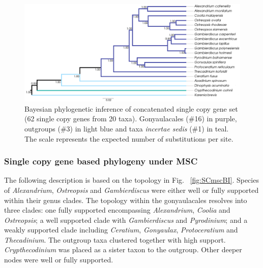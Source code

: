 \documentclass[fleqn,10pt,lineno]{wlpeerj} %
\begin{document}
\begin{figure}[ht] 
\centering
\includegraphics[width=\linewidth]{gonya-figs/SC-concat-BI.png} 
\caption{Bayesian phylogenetic inference of concatenated single copy gene set (62 single copy genes from 20 taxa). Gonyaulacales (\#16) in purple, outgroups (\#3) in light blue and taxa \textit{incertae sedis} (\#1) in teal. The scale represents the expected number of substitutions per site.} 
\label{fig:SCconcatBI}
\end{figure} 

\subsubsection*{Single copy gene based phylogeny under MSC}
The following description is based on the topology in Fig. ~\ref{fig:SCmscBI}. 
Species of \emph{Alexandrium}, \emph{Ostreopsis} and \emph{Gambierdiscus} were either well or fully supported within their genus clades. 
The topology within the gonyaulacales resolves into three clades: 
one fully supported encompassing \emph{Alexandrium}, \emph{Coolia} and \emph{Ostreopsis};
a well supported clade with \emph{Gambierdiscus} and \emph{Pyrodinium}; 
and a weakly supported clade including \emph{Ceratium}, \emph{Gonyaulax}, \emph{Protoceratium} and \emph{Thecadinium}. 
The outgroup taxa clustered together with high support. 
\emph{Crypthecodinium} was placed as a sister taxon to the outgroup. 
Other deeper nodes were well or fully supported.
\end{document}
